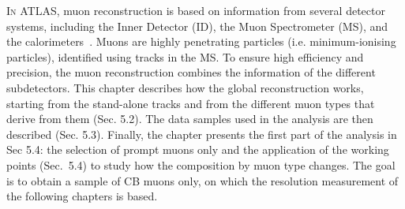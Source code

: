 \documentclass[11pt,a4paper,twoside,openright]{report}
\begin{document}
\lettrine[lines=3,loversize=0.1,lraise=0.05]{I}{n} ATLAS, muon reconstruction is based on information from several detector systems, including the Inner Detector (ID), the Muon Spectrometer (MS), and the calorimeters~\cite{Journ}. Muons are highly penetrating particles (i.e. minimum-ionising particles), identified using tracks in the MS. To ensure high efficiency and precision, the muon reconstruction combines the information of the different subdetectors. This chapter describes how the global reconstruction works, starting from the stand-alone tracks and from the different muon types that derive from them (Sec. 5.2). The data samples used in the analysis are then described (Sec. 5.3). Finally, the chapter presents the first part of the analysis in Sec 5.4: the selection of prompt muons only and the application of the working points (Sec.~5.4) to study how the composition by muon type changes. The goal is to obtain a sample of CB muons only, on which the resolution measurement of the following chapters is based.
\end{document}
